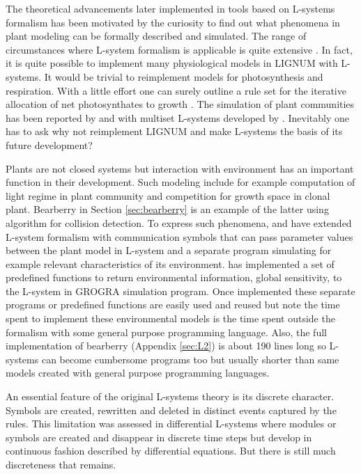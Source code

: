 The  theoretical  advancements later  implemented  in  tools based  on
L-systems formalism  has been motivated  by the curiosity to  find out
what  phenomena  in  plant  modeling  can be  formally  described  and
simulated.   The range  of circumstances  where L-system  formalism is
applicable  is quite extensive  \citep{pp:99}.  In  fact, it  is quite
possible  to  implement  many  physiological  models  in  LIGNUM  with
L-systems.    It  would   be   trivial  to   reimplement  models   for
photosynthesis and  respiration.  With a little effort  one can surely
outline a rule set for  the iterative allocation of net photosynthates
to  growth   \citep{perttunen:96,  perttunen:98,  perttunen:01}.   The
simulation of plant communities  has been reported by \citet{kurth:99}
and with multiset  L-systems developed by \citet{lane:02}.  Inevitably
one has to ask why not reimplement LIGNUM and make L-systems the basis
of its future development?

Plants are not closed systems  but interaction with environment has an
important function  in their  development.  Such modeling  include for
example computation of light regime in plant community and competition
for   growth   space   in   clonal  plant.    Bearberry   in   Section
\ref{sec:bearberry} is  an example of  the latter using  algorithm for
collision detection.   To express such  phenomena, \citet{mech:97} and
\citet{mech:96}  have extended  L-system formalism  with communication
symbols  that can  pass parameter  values between  the plant  model in
L-system  and  a  separate  program simulating  for  example  relevant
characteristics of its  environment.  \citet{kurth:94} has implemented
a  set of  predefined functions  to return  environmental information,
global  sensitivity, to  the  L-system in  GROGRA simulation  program.
Once implemented  these separate programs or  predefined functions are
easily  used and reused  but note  the time  spent to  implement these
environmental models is the time spent outside the formalism with some
general purpose  programming language.  Also,  the full implementation
of  bearberry  (Appendix  \ref{sec:L2})  is  about 190  lines  long  so
L-systems can become cumbersome  programs too but usually shorter than
same models created with general purpose programming languages.
 
An essential feature of the  original L-systems theory is its discrete
character.   Symbols are  created, rewritten  and deleted  in distinct
events  captured  by  the  rules.   This limitation  was  assessed  in
differential L-systems \citep{hammel:96}  where modules or symbols are
created and disappear in discrete time steps but develop in continuous
fashion described  by differential equations. But there  is still much
discreteness that remains.

